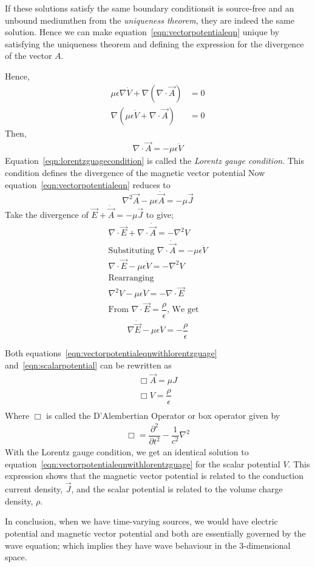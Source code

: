 If these solutions satisfy the same boundary conditions\textemdash it is source-free and an unbound medium\textemdash then from the \emph{uniqueness theorem}, they are indeed the same solution. Hence we can make equation~\eqref{eqn:vectorpotentialeqn} unique by satisfying the uniqueness theorem and defining the expression for the divergence of the vector $A$.

Hence,
\begin{align*}
\mu\epsilon\nabla\dot{V}+\nabla(\nabla\cdot\vec{A})&=0\\
\nabla(\mu\epsilon\dot{V}+\nabla\cdot\vec{A})&=0
\end{align*}
Then,
\begin{align}
\nabla\cdot\vec{A}=-\mu\epsilon\dot{V}
\label{eqn:lorentzguagecondition}
\end{align}
Equation~\eqref{eqn:lorentzguagecondition} is called the \emph{Lorentz gauge condition}. This condition defines the divergence of the magnetic vector potential
Now equation~\eqref{eqn:vectorpotentialeqn} reduces to
\begin{equation}
\nabla^{2}\vec{A}-\mu\epsilon\ddot{\vec{A}}=-\mu\vec{J}
\label{eqn:vectorpotentialeqnwithlorentzguage}
\end{equation} 
Take the divergence of $\vec{E}+\dot{\vec{A}}=-\mu\vec{J}$ to give;
\begin{align*}
&\nabla\cdot\vec{E}+\nabla\cdot\dot{\vec{A}}=-\nabla^{2} V&\\
&\text{Substituting $\nabla\cdotp\dot{\vec{A}}=-\mu\epsilon\ddot{V}$}&\\
&\nabla\cdotp\vec{E}-\mu\epsilon\ddot{V}=-\nabla^{2} V&\\
&\text{Rearranging}&\\
&\nabla^{2} V-\mu\epsilon\ddot{V}=-\nabla\cdotp\vec{E}&\\
&\text{From $\nabla\cdotp\vec{E}=\dfrac{\rho}{\epsilon}$, We get}&
\end{align*}
\begin{equation}
\nabla\dot\vec{E}-\mu\epsilon\ddot{V}=-\dfrac{\rho}{\epsilon}
\label{eqn:scalarpotential}
\end{equation}

Both equations~\eqref{eqn:vectorpotentialeqnwithlorentzguage} and~\eqref{eqn:scalarpotential} can be rewritten as
\begin{align*}
\Box\vec{A}=\mu J\\
\Box V=\dfrac{\rho}{\epsilon}\\
\end{align*}
Where $\Box$ is called the D'Alembertian Operator or box operator given by 
\begin{align*}
\Box=\dfrac{\partial^{2}}{\partial t^{2}}-\dfrac{1}{c^{2}}\nabla^{2}
\end{align*}
With the Lorentz gauge condition, we get an identical solution to equation~\eqref{eqn:vectorpotentialeqnwithlorentzguage} for the scalar potential $V$. This expression shows that the magnetic vector potential is related to the conduction current density, $\vec{J}$, and the scalar potential is related to the volume charge density, $\rho$.

In conclusion, when we have time-varying sources, we would have electric potential and magnetic vector potential and both are essentially governed by the wave equation; which implies they have wave behaviour in the 3-dimensional space.
